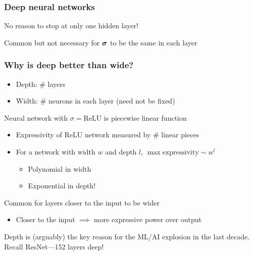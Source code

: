 \begin{frame}
    \frametitle{Deep neural networks}

    No reason to stop at only one hidden layer!

    \vspace{1mm}
    
    \vspace{1mm}

    Common but not necessary for $\bm{\sigma}$ to be the same in each layer
\end{frame}

\begin{frame}
    \frametitle{Why is deep better than wide?}
    \begin{itemize}
        \item Depth: \# layers
        \item Width: \# neurons in each layer (need not be fixed)
    \end{itemize}
    \pause

    Neural network with $\sigma = \text{ReLU}$ is piecewise linear function
    \begin{itemize}
        \item \alert{Expressivity} of ReLU network measured by \# linear pieces
        \item For a network with width $w$ and depth $l$, \alert{$\max \text{expressivity} \sim w^l$} \citep{Pascanu13,MontufarNIPS14,Chen16}
        \begin{itemize}
            \item Polynomial in width
            \item Exponential in depth!
        \end{itemize}
    \end{itemize}
    \pause

    Common for layers closer to the input to be wider
    \begin{itemize}
        \item Closer to the input $\implies$ more expressive power over output \citep{RaghuICML17}
    \end{itemize}
    \pause

    \begin{block}{}
        Depth is (arguably) the key reason for the ML/AI explosion in the last decade.
        Recall ResNet---152 layers deep!
    \end{block}
\end{frame}

